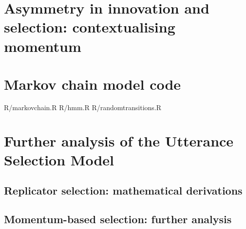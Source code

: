 \documentclass[oneside]{book}
\newcommand{\includeR}[1]{#1}
\begin{document}
\chapter[Asymmetry in innovation and selection]{Asymmetry in innovation and selection: contextualising momentum}
\label{ch:bigpicture}


%



\newpage
{}
\printindex

\appendix
%

\chapter{Markov chain model code}
\label{app:markovmodel}
\includeR{R/markovchain.R}
\includeR{R/hmm.R}
\includeR{R/randomtransitions.R}

\chapter[Further analysis of the USM]{Further analysis of the Utterance Selection Model}
\label{app:math}

\section{Replicator selection: mathematical derivations}
\label{app:usm}
%

\section{Momentum-based selection: further analysis}
\label{app:momentum}
%
\end{document}
